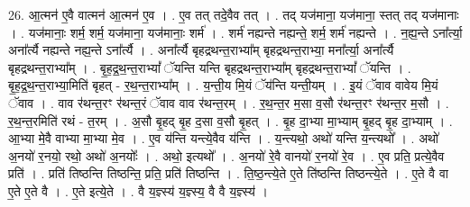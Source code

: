 \documentclass[17pt]{extarticle}
\begin{document}
26. आ॒त्मन॑ ए॒वै वात्मन॑ आ॒त्मन॑ ए॒व । . ए॒व तत् तदे॒वैव तत् । . तद् यज॑माना॒ यज॑माना॒ स्तत् तद् यज॑मानाः । . यज॑मानाः॒ शर्म॒ शर्म॒ यज॑माना॒ यज॑मानाः॒ शर्म॑ । . शर्म॑ नह्यन्ते नह्यन्ते॒ शर्म॒ शर्म॑ नह्यन्ते । . न॒ह्य॒न्ते ऽना᳚र्त्या॒ अना᳚र्त्यै नह्यन्ते नह्य॒न्ते ऽना᳚र्त्यै । . अना᳚र्त्यै बृहद्रथन्त॒राभ्या᳚म् बृहद्रथन्त॒राभ्या॒ मना᳚र्त्या॒ अना᳚र्त्यै बृहद्रथन्त॒राभ्या᳚म् । . बृ॒ह॒द्र॒थ॒न्त॒राभ्यां᳚ ॅयन्ति यन्ति बृहद्रथन्त॒राभ्या᳚म् बृहद्रथन्त॒राभ्यां᳚ ॅयन्ति । . बृ॒ह॒द्र॒थ॒न्त॒राभ्या॒मिति॑ बृहत् - र॒थ॒न्त॒राभ्या᳚म् । . य॒न्ती॒य मि॒यं ॅय॑न्ति यन्ती॒यम् । . इ॒यं ॅवाव वावेय मि॒यं ॅवाव । . वाव र॑थन्त॒रꣳ र॑थन्त॒रं ॅवाव वाव र॑थन्त॒रम् । . र॒थ॒न्त॒र म॒सा व॒सौ र॑थन्त॒रꣳ र॑थन्त॒र म॒सौ । . र॒थ॒न्त॒रमिति॑ रथं - त॒रम् । . अ॒सौ बृ॒हद् बृ॒ह द॒सा व॒सौ बृ॒हत् । . बृ॒ह दा॒भ्या मा॒भ्याम् बृ॒हद् बृ॒ह दा॒भ्याम् । . आ॒भ्या मे॒वै वाभ्या मा॒भ्या मे॒व । . ए॒व य॑न्ति यन्त्ये॒वैव य॑न्ति । . य॒न्त्यथो॒ अथो॑ यन्ति य॒न्त्यथो᳚ । . अथो॑ अ॒नयो॑ र॒नयो॒ रथो॒ अथो॑ अ॒नयोः᳚ । . अथो॒ इत्यथो᳚ । . अ॒नयो॑ रे॒वै वानयो॑ र॒नयो॑ रे॒व । . ए॒व प्रति॒ प्रत्ये॒वैव प्रति॑ । . प्रति॑ तिष्ठन्ति तिष्ठन्ति॒ प्रति॒ प्रति॑ तिष्ठन्ति । . ति॒ष्ठ॒न्त्ये॒ते ए॒ते ति॑ष्ठन्ति तिष्ठन्त्ये॒ते । . ए॒ते वै वा ए॒ते ए॒ते वै । . ए॒ते इत्ये॒ते । . वै य॒ज्ञ्स्य॑ य॒ज्ञ्स्य॒ वै वै य॒ज्ञ्स्य॑ । \newline
\end{document}
